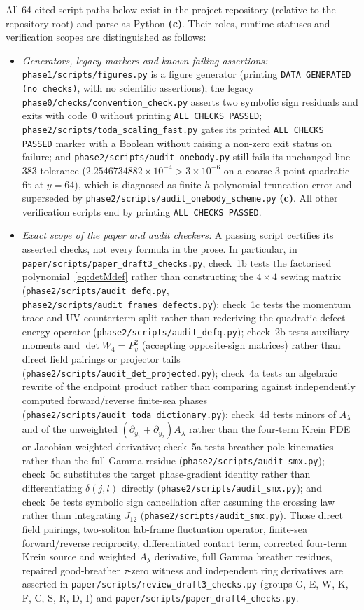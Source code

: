 \documentclass[11pt,a4paper]{article}
\newcommand{\lab}[1]{{\normalfont\sffamily\footnotesize\bfseries(#1)}}
\newcommand{\Lc}{\lab{c}}
\newcommand{\scr}[1]{\nolinkurl{#1}}
\theoremstyle{remark}
\begin{document}
All 64 cited script paths below exist in the project repository (relative to the repository root) and parse as Python \Lc. Their roles, runtime statuses and verification scopes are distinguished as follows:
\begin{itemize}
\item \emph{Generators, legacy markers and known failing assertions:} \scr{phase1/scripts/figures.py} is a figure generator (printing \texttt{DATA GENERATED (no checks)}, with no scientific assertions); the legacy \scr{phase0/checks/convention_check.py} asserts two symbolic sign residuals and exits with code~0 without printing \texttt{ALL CHECKS PASSED}; \scr{phase2/scripts/toda_scaling_fast.py} gates its printed \texttt{ALL CHECKS PASSED} marker with a Boolean without raising a non-zero exit status on failure; and \scr{phase2/scripts/audit_onebody.py} still fails its unchanged line-383 tolerance ($2.2546734882\times10^{-4}>3\times10^{-6}$ on a coarse 3-point quadratic fit at $y=64$), which is diagnosed as finite-$h$ polynomial truncation error and superseded by \scr{phase2/scripts/audit_onebody_scheme.py} \Lc. All other verification scripts end by printing \texttt{ALL CHECKS PASSED}.
\item \emph{Exact scope of the paper and audit checkers:} A passing script certifies its asserted checks, not every formula in the prose. In particular, in \scr{paper/scripts/paper_draft3_checks.py}, check~1b tests the factorised polynomial~\eqref{eq:detMdef} rather than constructing the $4\times4$ sewing matrix (\scr{phase2/scripts/audit_defq.py}, \scr{phase2/scripts/audit_frames_defects.py}); check~1c tests the momentum trace and UV counterterm split rather than rederiving the quadratic defect energy operator (\scr{phase2/scripts/audit_defq.py}); check~2b tests auxiliary moments and $\det W_4=P_v^2$ (accepting opposite-sign matrices) rather than direct field pairings or projector tails (\scr{phase2/scripts/audit_det_projected.py}); check~4a tests an algebraic rewrite of the endpoint product rather than comparing against independently computed forward/reverse finite-sea phases (\scr{phase2/scripts/audit_toda_dictionary.py}); check~4d tests minors of $A_\lambda$ and of the unweighted $(\partial_{y_1}+\partial_{y_2})A_\lambda$ rather than the four-term Krein PDE or Jacobian-weighted derivative; check~5a tests breather pole kinematics rather than the full Gamma residue (\scr{phase2/scripts/audit_smx.py}); check~5d substitutes the target phase-gradient identity rather than differentiating $\delta(j,l)$ directly (\scr{phase2/scripts/audit_smx.py}); and check~5e tests symbolic sign cancellation after assuming the crossing law rather than integrating $J_{12}$ (\scr{phase2/scripts/audit_smx.py}). Those direct field pairings, two-soliton lab-frame fluctuation operator, finite-sea forward/reverse reciprocity, differentiated contact term, corrected four-term Krein source and weighted $A_\lambda$ derivative, full Gamma breather residues, repaired good-breather $\tau$-zero witness and independent ring derivatives are asserted in \nolinkurl{paper/scripts/review_draft3_checks.py} (groups G, E, W, K, F, C, S, R, D, I) and \nolinkurl{paper/scripts/paper_draft4_checks.py}.
\end{itemize}
\end{document}
